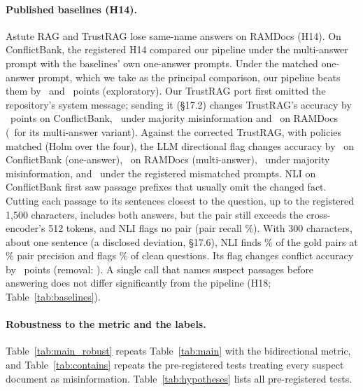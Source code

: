 \paragraph{Published baselines (H14).} Astute RAG \citep{wang2025astute} and TrustRAG \citep{zhou2025trustrag} lose same-name answers
on RAMDocs (H14). On ConflictBank, the registered H14 compared our pipeline under the multi-answer prompt with the
baselines' own one-answer prompts. Under the matched one-answer prompt, which we take as the principal comparison, our pipeline beats them by
\hFourteenMatchedAst\ and \hFourteenMatchedTr\ points (exploratory). Our TrustRAG port
first omitted the repository's system message; sending it (\S17.2) changes TrustRAG's accuracy by \blTrustSysCb\
points on ConflictBank, \blTrustSysMj\ under majority misinformation and \blTrustSysRd\ on RAMDocs (\blTrustSysRdMulti\
for its multi-answer variant). Against the corrected TrustRAG, with policies matched (Holm over the four), the LLM
directional flag changes accuracy by \blHFourteenCbs\ on ConflictBank (one-answer), \blHFourteenRd\ on RAMDocs (multi-answer),
\blHFourteenMj\ under majority misinformation, and \blHFourteenCb\ under the registered mismatched prompts.
NLI on ConflictBank first saw passage prefixes that usually omit the changed fact. Cutting each passage to its
sentences closest to the question, up to the registered 1,500 characters, includes both answers, but the
pair still exceeds the cross-encoder's 512 tokens, and NLI flags no pair (pair recall \detNliWinRecall\%). With
300 characters, about one sentence (a disclosed deviation, \S17.6), NLI finds \detNliSentRecall\% of the gold pairs at
\detNliSentPrec\% pair precision and flags \detNliSentCleanFpr\% of clean questions. Its flag changes conflict
accuracy by \blNliSentFlag\ points (removal: \blNliSentRem). A single call that names suspect passages before
answering does not differ significantly from the pipeline (H18; Table~\ref{tab:baselines}).

\paragraph{Robustness to the metric and the labels.}
Table~\ref{tab:main_robust} repeats Table~\ref{tab:main} with the bidirectional metric, and Table~\ref{tab:contains}
repeats the pre-registered tests treating every suspect document as misinformation. Table~\ref{tab:hypotheses}
lists all pre-registered tests.


